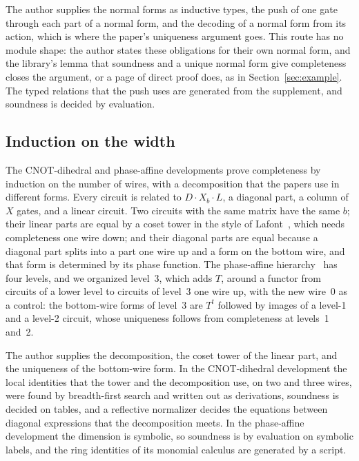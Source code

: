 The author supplies the normal forms as inductive types, the push of
one gate through each part of a normal form, and the decoding of a
normal form from its action, which is where the paper's uniqueness
argument goes. This route has no module shape: the author states these
obligations for their own normal form, and the library's lemma that
soundness and a unique normal form give completeness closes the
argument, or a page of direct proof does, as in
Section~\ref{sec:example}. The typed relations that the push uses are
generated from the supplement, and soundness is decided by evaluation.

\subsection{Induction on the width}\label{sec:width}

The CNOT-dihedral and phase-affine developments prove completeness by
induction on the number of wires, with a decomposition that the papers
use in different forms. Every circuit is related to
$D\cdot X_b \cdot L$, a diagonal part, a column of $X$ gates, and a
linear circuit. Two circuits with the same matrix have the same $b$;
their linear parts are equal by a coset tower in the style of
Lafont~\cite{lafont2003boolean}, which needs completeness one wire
down; and their diagonal parts are equal because a diagonal part
splits into a part one wire up and a form on the bottom wire, and that
form is determined by its phase function. The phase-affine
hierarchy~\cite{blake2026phaseaffine} has four levels, and we organized
level~3, which adds $T$, around a functor from circuits of a lower
level to circuits of level~3 one wire up, with the new wire~0 as a
control: the bottom-wire forms of level~3 are $T^t$ followed by images
of a level-1 and a level-2 circuit, whose uniqueness follows from
completeness at levels~1 and~2.

The author supplies the decomposition, the coset tower of the linear
part, and the uniqueness of the bottom-wire form. In the CNOT-dihedral
development the local identities that the tower and the decomposition
use, on two and three wires, were found by breadth-first search and
written out as derivations, soundness is decided on tables, and a
reflective normalizer decides the equations between diagonal
expressions that the decomposition meets. In the phase-affine
development the dimension is symbolic, so soundness is by evaluation on
symbolic labels, and the ring identities of its monomial calculus are
generated by a script.

